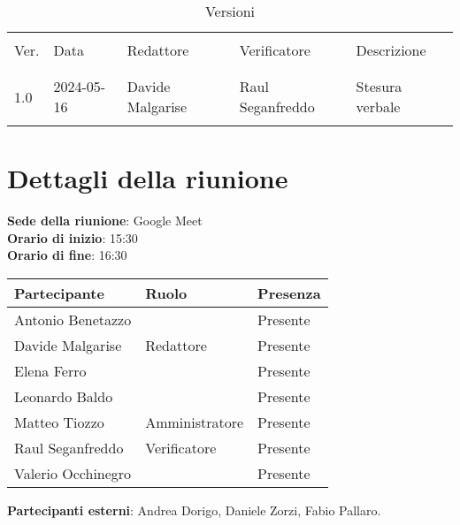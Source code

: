 \documentclass[italian,12pt]{article}
\begin{document}


\newpage



\begin{table}[!h]
	\caption{Versioni}
	\footnotesize
	\begin{center}
		\begin{tabular}{ l l l l p{6cm} }
			\hline                                                             \\[-2ex]
			Ver. & Data       & Redattore   & Verificatore   & Descrizione     \\
			\\[-2ex] \hline \\[-1.5ex]
			1.0  & 2024-05-16 & Davide Malgarise & Raul Seganfreddo & Stesura verbale \\
			\\[-1.5ex] \hline
		\end{tabular}
	\end{center}
\end{table}

\newpage

\tableofcontents

\newpage

\section{Dettagli della riunione}


\textbf{Sede della riunione}: Google Meet\\
\textbf{Orario di inizio}: 15:30\\
\textbf{Orario di fine}: 16:30\\

\begin{flushleft}
	\begin{table}[!h]
		\begin{tabular}{ |l|l|l| }
			\hline
			\textbf{Partecipante} & \textbf{Ruolo}  & \textbf{Presenza} \\
			\hline
			Antonio Benetazzo     &                 & Presente          \\
			Davide Malgarise      & Redattore       & Presente          \\
			Elena Ferro           &                 & Presente          \\
			Leonardo Baldo        & 			    & Presente          \\
			Matteo Tiozzo         & Amministratore  & Presente          \\
			Raul Seganfreddo      & Verificatore    & Presente          \\
			Valerio Occhinegro    &                 & Presente          \\
			\hline
		\end{tabular}
	\end{table}
	\textbf{Partecipanti esterni}: Andrea Dorigo, Daniele Zorzi, Fabio Pallaro.\\
\end{flushleft}
\end{document}
